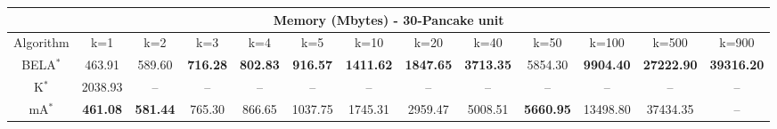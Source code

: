 \begin{tabular}{c|cccccccccccc}\toprule
\multicolumn{13}{c}{Memory (Mbytes) - 30-Pancake unit}\\ \midrule
Algorithm & k=1 & k=2 & k=3 & k=4 & k=5 & k=10 & k=20 & k=40 & k=50 & k=100 & k=500 & k=900 \\ \midrule
BELA$^*$ & 463.91 & 589.60 & \textbf{716.28} & \textbf{802.83} & \textbf{916.57} & \textbf{1411.62} & \textbf{1847.65} & \textbf{3713.35} & 5854.30 & \textbf{9904.40} & \textbf{27222.90} & \textbf{39316.20} \\
K$^*$ & 2038.93 & -- & -- & -- & -- & -- & -- & -- & -- & -- & -- & -- \\
mA$^*$ & \textbf{461.08} & \textbf{581.44} & 765.30 & 866.65 & 1037.75 & 1745.31 & 2959.47 & 5008.51 & \textbf{5660.95} & 13498.80 & 37434.35 & -- \\ \bottomrule 
\end{tabular}
